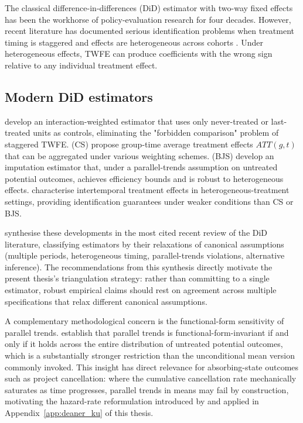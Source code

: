 The classical difference-in-differences (DiD) estimator with two-way fixed effects \cite{ashenfelter1985using} has been the workhorse of policy-evaluation research for four decades. However, recent literature has documented serious identification problems when treatment timing is staggered and effects are heterogeneous across cohorts \cite{goodman2021difference,dechaisemartin2020two,callaway2021difference}. Under heterogeneous effects, TWFE can produce coefficients with the wrong sign relative to any individual treatment effect.

\subsection{Modern DiD estimators}

\cite{sun2021estimating} develop an interaction-weighted estimator that uses only never-treated or last-treated units as controls, eliminating the "forbidden comparison" problem of staggered TWFE. \cite{callaway2021difference} (CS) propose group-time average treatment effects $ATT(g,t)$ that can be aggregated under various weighting schemes. \cite{borusyak2024revisiting} (BJS) develop an imputation estimator that, under a parallel-trends assumption on untreated potential outcomes, achieves efficiency bounds and is robust to heterogeneous effects. \cite{dechaisemartin2024intertemporal} characterise intertemporal treatment effects in heterogeneous-treatment settings, providing identification guarantees under weaker conditions than CS or BJS.

\cite{roth2023trending} synthesise these developments in the most cited recent review of the DiD literature, classifying estimators by their relaxations of canonical assumptions (multiple periods, heterogeneous timing, parallel-trends violations, alternative inference). The recommendations from this synthesis directly motivate the present thesis's triangulation strategy: rather than committing to a single estimator, robust empirical claims should rest on agreement across multiple specifications that relax different canonical assumptions.

A complementary methodological concern is the functional-form sensitivity of parallel trends. \cite{rothsantanna2023parallel} establish that parallel trends is functional-form-invariant if and only if it holds across the entire distribution of untreated potential outcomes, which is a substantially stronger restriction than the unconditional mean version commonly invoked. This insight has direct relevance for absorbing-state outcomes such as project cancellation: where the cumulative cancellation rate mechanically saturates as time progresses, parallel trends in means may fail by construction, motivating the hazard-rate reformulation introduced by \cite{deaner2024causal} and applied in Appendix~\ref{app:deaner_ku} of this thesis.

